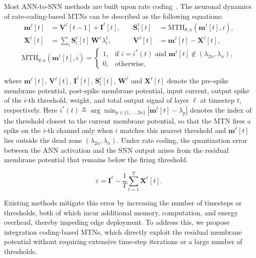 Most ANN-to-SNN  methods are built upon rate coding~\cite{you2024spikezip,wang2022signed,wang2026training}. The neuronal dynamics of rate-coding-based MTNs can be described as the following equations: 
\begin{equation}
\begin{aligned}
\mathbf{m}^\ell[t] &= \mathbf{V}^\ell[t-1] + \mathbf{I}^{\ell}[t], &\quad
\mathbf{S}_i^\ell[t] &= \mathrm{MTH}_{\theta,n}(\mathbf{m}^\ell[t], i), \\
\mathbf{X}^\ell[t] &= \sum_i \mathbf{S}_i^\ell[t]\,\mathbf{W}^\ell \lambda_i^\ell, &\quad
\mathbf{V}^\ell[t] &= \mathbf{m}^\ell[t] - \mathbf{X}^\ell[t],
\end{aligned}
\end{equation}
\begin{equation}
\mathrm{MTH}_{\theta,n}(\mathbf{m}^\ell[t], i) = 
\begin{cases}
1, & \text{if } i = i^*(t) \text{ and } \mathbf{m}^\ell[t] \notin (\lambda_{2n}, \lambda_n), \\
0, & \text{otherwise},
\end{cases}
\end{equation}

where $\mathbf{m}^\ell[t]$, $\mathbf{V}^\ell[t]$, $\mathbf{I}^\ell[t]$, $\mathbf{S}_i^\ell[t]$, 
$\mathbf{W}^\ell$ and $\mathbf{X}^\ell[t]$ denote the pre-spike membrane potential, 
post-spike membrane potential, input current, output spike of the $i$-th 
threshold, weight, and total output signal of layer $\ell$ at timestep $t$, 
respectively. Here $i^*(t) \triangleq \arg\min_{p \in \{1,\ldots,2n\}} 
|\mathbf{m}^\ell[t] - \lambda_p|$ denotes the index of the threshold closest to the 
current membrane potential, so that the MTN fires a spike on the $i$-th 
channel only when $i$ matches this nearest threshold and $\mathbf{m}^\ell[t]$ lies 
outside the dead zone $(\lambda_{2n}, \lambda_n)$. Under rate coding, the 
quantization error between the ANN activation and the SNN output arises 
from the residual membrane potential that remains below the firing 
threshold. 
\begin{addedblock}
\begin{equation}
\varepsilon  = {\mathbf{I}^\ell} - \frac{1}{T}\sum\limits_{t = 1}^T {{\mathbf{X}^\ell}[t]}.
\end{equation}
\end{addedblock}
Existing methods mitigate this error by increasing the number 
of timesteps or thresholds, both of which incur additional memory, 
computation, and energy overhead, thereby impeding edge deployment. To 
address this, we propose integration coding-based MTNs, which directly 
exploit the residual membrane potential without requiring extensive 
time-step iterations or a large number of thresholds.

